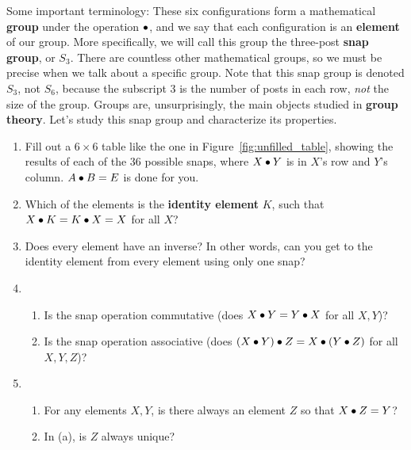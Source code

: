 \documentclass[../textbook.tex]{subfiles}
\begin{document}
Some important terminology: These six configurations form a mathematical \textbf{group} under the operation $\bullet$, and we say that each configuration is an \textbf{element} of our group.
More specifically, we will call this group the three-post \textbf{snap group}, or $S_3$. There are countless other mathematical groups, so we must be precise when we talk about a specific group. Note that this snap group is denoted $S_3$, not $S_6$, because the subscript $3$ is the number of posts in each row, \textit{not} the size of the group.
Groups are, unsurprisingly, the main objects studied in \textbf{group theory}.
Let's study this snap group and characterize its properties.

\begin{enumerate}
\item Fill out a $6\times 6$ table like the one in Figure~\ref{fig:unfilled_table}, showing the results of each of the $36$ possible snaps, where $X\bullet Y$ is in $X$'s row and $Y$'s column. $A\bullet B=E$ is done for you.
\item Which of the elements is the \textbf{identity element} $K$, such that $X\bullet K = K\bullet X = X$ for all $X$? \label{prob:group_definition_start}
\item Does every element have an inverse? In other words, can you get to the identity element from every element using only one snap?
\item \begin{enumerate}
\item Is the snap operation commutative (does $X \bullet Y = Y \bullet X$ for all $X,Y$)?
\item Is the snap operation associative (does $(X \bullet Y) \bullet Z = X \bullet (Y\bullet Z)$ for all $X,Y,Z$)?
\end{enumerate}
\item \begin{enumerate}
\item For any elements $X, Y$, is there always an element $Z$ so that $X\bullet Z=Y$?
\item In (a), is $Z$ always unique?
\end{enumerate}
\setcounter{some_name}{\value{enumi}}
\end{enumerate}%
\end{document}
